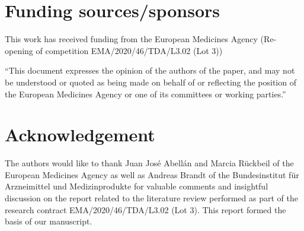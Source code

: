 \documentclass{article}
\begin{document}
\newpage
\section{ Funding sources/sponsors}

\noindent 

\noindent This work has received funding from the European Medicines Agency (Re-opening of competition EMA/2020/46/TDA/L3.02 (Lot 3))


\noindent ``This document expresses the opinion of the authors of the paper, and may not be understood or quoted as being made on behalf of or reflecting the position of the European Medicines Agency or one of its committees or working parties.''

\section{Acknowledgement}
The authors would like to thank Juan Jos\'e Abell\'an and Marcia R\"uckbeil of the European Medicines Agency as well as Andreas Brandt of the Bundesinstitut für Arzneimittel und Medizinprodukte for valuable comments and insightful discussion on the report related to the literature review performed as part of the research contract EMA/2020/46/TDA/L3.02 (Lot 3). This report formed the basis of our manuscript.

\noindent 


%
%
%



\nocite{}
%
%

\end{document}
